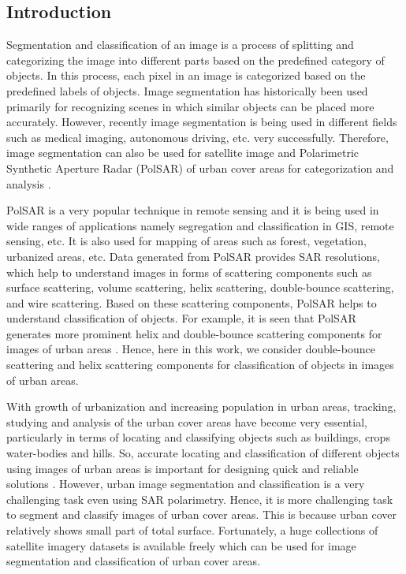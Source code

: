 \documentclass[a4paper,12pt]{spieman}  %
\begin{document}
\begin{spacing}{1}   %
\section{Introduction}
\label{sect:intro}  %
Segmentation and classification of an image is a process of splitting and categorizing the image into different parts based on the predefined category of objects. In this process, each pixel in an image is categorized based on the predefined labels of objects. Image segmentation has historically been used primarily for recognizing scenes in which similar objects can be placed more accurately. However, recently image segmentation is being used in different fields such as medical imaging, autonomous driving, etc. very successfully. Therefore, image segmentation can also be used for satellite image and Polarimetric Synthetic Aperture Radar (PolSAR) of urban cover areas for categorization and analysis \citep{taghanaki2021deep, niu2012context}.
\par PolSAR is a very popular technique in remote sensing and it is being used in wide ranges of applications namely segregation and classification in GIS, remote sensing, etc. It is also used for mapping of areas such as forest, vegetation, urbanized areas, etc. Data generated from PolSAR provides SAR resolutions, which help to understand images in forms of scattering components such as surface scattering, volume scattering, helix scattering, double-bounce scattering, and wire scattering. Based on these scattering components, PolSAR helps to understand classification of objects. For example,  it is seen that PolSAR generates more prominent helix and double-bounce scattering components for images of urban areas  \citep{zhou2018multi, chen2018polsar, zhang2015land}. Hence, here in this work, we consider double-bounce scattering and helix scattering components for classification of objects in images of urban areas.
\par With growth of urbanization and increasing population in urban areas, tracking, studying and analysis of the urban cover areas have become very essential, particularly in terms of locating and classifying objects such as buildings, crops water-bodies and hills. So, accurate locating and classification of different objects using images of urban areas is important for designing quick and reliable solutions \citep{de2017novel}. However, urban image segmentation and classification is a very challenging task even using SAR polarimetry. Hence, it is more challenging task to segment and classify images of urban cover areas. This is because urban cover relatively shows small part of total surface. Fortunately, a huge collections of satellite imagery datasets is available freely which can be used for image segmentation and classification of urban cover areas.

\end{spacing}
\end{document}
